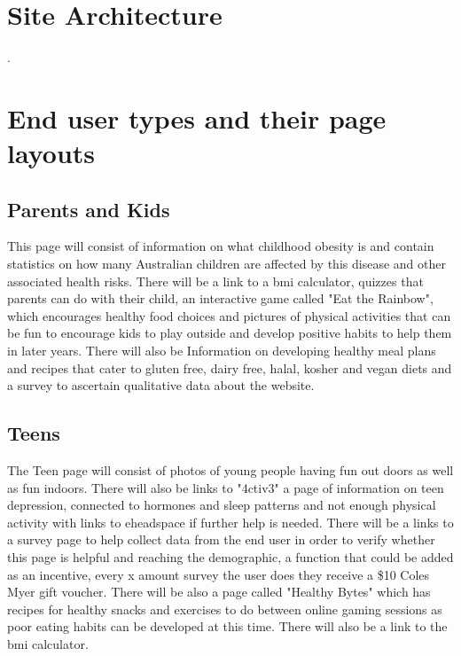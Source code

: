 \documentclass[letterpaper,twoside,12pt]{article}
\begin{document}
\section{Site Architecture}

.


\section{End user types and their page layouts}
\subsection{Parents and Kids}

This page will consist of information on what childhood obesity is and contain statistics on how many Australian children are affected by this disease and other associated health risks. There will be a link to a \acrfull{bmi} calculator, quizzes that parents can do with their child, an interactive game called "Eat the Rainbow", which encourages healthy food choices and pictures of physical activities that can be fun to encourage kids to play outside and develop positive habits to help them in later years. There will also be Information on developing healthy meal plans and recipes that cater to gluten free, dairy free, halal, kosher and vegan diets and a survey to ascertain qualitative data about the website.

\subsection{Teens}

The Teen page will consist of photos of young people having fun out doors as well as fun indoors. There will also be links to "4ctiv3" a page of information on teen depression, connected to hormones and sleep patterns and not enough physical activity with links to eheadspace if further help is needed. There will be a links to a survey page to help collect data from the end user in order to verify whether this page is helpful and reaching the demographic, a function that could be added as an incentive, every x amount survey the user does they receive a \$10 Coles Myer gift voucher. There will be also a page called "Healthy Bytes" which has recipes for healthy snacks and exercises to do between online gaming sessions as poor eating habits can be developed at this time. There will also be a link to the \acrshort{bmi} calculator.
\end{document}
